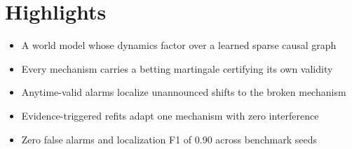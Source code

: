 \documentclass{article}
\begin{document}
\section*{Highlights}
\begin{itemize}
\item A world model whose dynamics factor over a learned sparse causal graph
\item Every mechanism carries a betting martingale certifying its own validity
\item Anytime-valid alarms localize unannounced shifts to the broken mechanism
\item Evidence-triggered refits adapt one mechanism with zero interference
\item Zero false alarms and localization F1 of 0.90 across benchmark seeds
\end{itemize}
\end{document}

